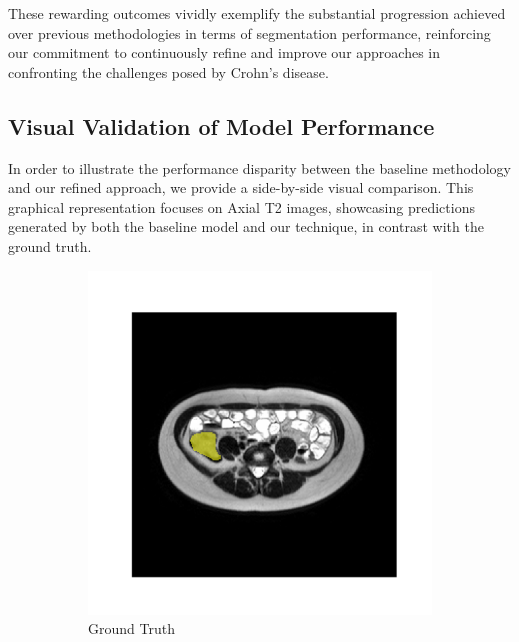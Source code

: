 These rewarding outcomes vividly exemplify the substantial progression achieved over previous methodologies in terms of segmentation performance, reinforcing our commitment to continuously refine and improve our approaches in confronting the challenges posed by Crohn's disease.
\subsection{Visual Validation of Model Performance}
In order to illustrate the performance disparity between the baseline methodology and our refined approach, we provide a side-by-side visual comparison. This graphical representation focuses on Axial T2 images, showcasing predictions generated by both the baseline model and our technique, in contrast with the ground truth.

\begin{figure}[htp]
\centering
\begin{subfigure}[b]{0.47\textwidth}
\centering
\includegraphics[width=\textwidth]{./figures/seg_gt.png}
\caption{Ground Truth}
\label{fig:gt}
\end{subfigure}
\hfill
\begin{subfigure}[b]{0.47\textwidth}
\centering

\end{subfigure}
\end{figure}
